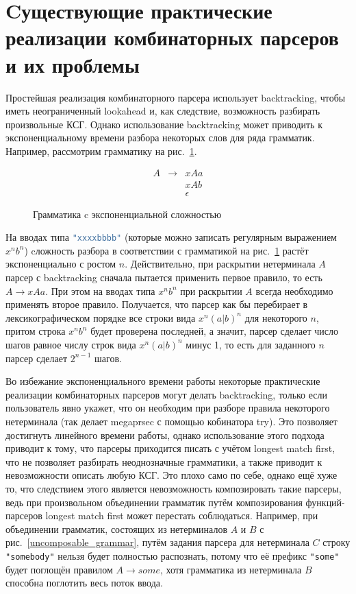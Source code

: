 \documentclass[times]{itmo-student-thesis}
\begin{document}
\section{Cуществующие практические реализации комбинаторных парсеров и их проблемы}\label{sec:current_parser_combinators_problems}

Простейшая реализация комбинаторного парсера использует backtracking, чтобы иметь неограниченный lookahead и, как
следствие, возможность разбирать произвольные КСГ. Однако использование backtracking может приводить к
экспоненциальному времени разбора некоторых слов для ряда грамматик. Например, рассмотрим грамматику на
рис.~\ref{exp_grammar}.

\begin{figure}[!h]
\caption{Грамматика c экспоненциальной сложностью}\label{exp_grammar}
\[
    \begin{array}{lll}
        A & \to & xAa      \\
          &     & xAb      \\
          &     & \epsilon
    \end{array}
\]
\end{figure}

На вводах типа \lstinline[language=Haskell]{"xxxxbbbb"} (которые можно записать регулярным выражением $x^nb^n$) cложность разбора
в соответствии с грамматикой на рис.~\ref{exp_grammar} растёт экспоненциально с ростом $n$.
Действительно, при раскрытии нетерминала $A$ парсер с backtracking сначала пытается применить первое
правило, то есть $A \to xAa$. При этом на вводах типа $x^nb^n$ при раскрытии
$A$ всегда необходимо применять второе правило. Получается, что парсер как бы перебирает в
лексикографическом порядке все строки вида $x^n(a|b)^n$ для некоторого $n$, притом строка
$x^nb^n$ будет проверена последней, а значит, парсер сделает число шагов равное числу строк вида
$x^n(a|b)^n$ минус 1, то есть для заданного $n$ парсер сделает $2^{n-1}$ шагов.

Во избежание экспоненциального времени работы некоторые практические реализации комбинаторных парсеров могут делать
backtracking, только если пользователь явно укажет, что он необходим при разборе правила некоторого нетерминала (так
делает megaprsec\cite{megaparsec} с помощью кобинатора try). Это позволяет достигнуть линейного времени работы,
однако использование этого подхода приводит к тому, что парсеры приходится писать с учётом longest match first, что не
позволяет разбирать неоднозначные грамматики, а также приводит к невозможности описать любую КСГ. Это плохо само по
себе, однако ещё хуже то, что следствием этого является невозможность композировать такие парсеры, ведь при
произвольном объединении грамматик путём композирования функций-парсеров longest match first может перестать
соблюдаться. Например, при объединении грамматик, состоящих из нетерминалов $A$ и
$B$ с рис.~\ref{uncomposable_grammar}, путём задания парсера для нетерминала $C$ строку
\lstinline|"somebody"| нельзя будет полностью распознать, потому что её префикс \lstinline|"some"| будет поглощён правилом
$A \to some$, хотя грамматика из нетерминала $B$ способна поглотить весь поток ввода.
\end{document}
